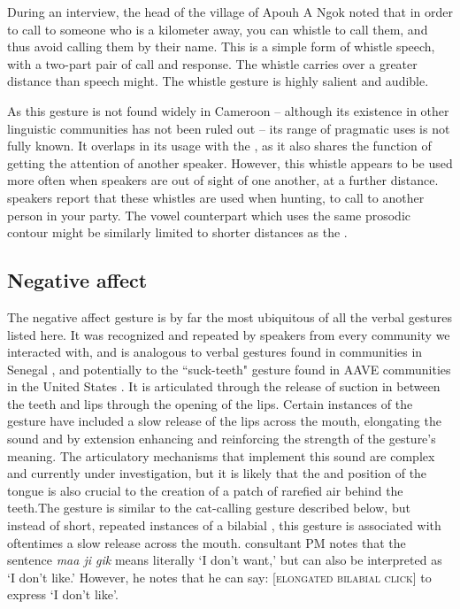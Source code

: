 \documentclass[output=paper
,newtxmath
,modfonts
,nonflat]{langsci/langscibook}
\begin{document}
During an interview, the head of the village of Apouh A Ngok noted that in order to call to someone who is a kilometer away, you can whistle to call them, and thus avoid calling them by their name. This is a simple form of whistle speech, with a two-part pair of call and response. The whistle carries over a greater distance than speech might. The whistle gesture is highly salient and audible. 

As this gesture is not found widely in Cameroon -- although its existence in other linguistic communities has not been ruled out -- its range of pragmatic uses is not fully known. It overlaps in its usage with the , as it also shares the function of getting the attention of another speaker.  However, this whistle appears to be used more often when speakers are out of sight of one another, at a further distance.  speakers report that these whistles are used when hunting, to call to another person in your party. The vowel counterpart which uses the same prosodic contour might be similarly limited to shorter distances as the . 

\subsection{Negative affect}\label{subsec:pillion:NegativeAffect}
The negative affect gesture is by far the most ubiquitous of all the verbal gestures listed here. It was recognized and repeated by speakers from every community we interacted with, and is analogous to verbal gestures found in  communities in Senegal \citep{grenobleetal2015}, and potentially to the ``suck-teeth" gesture found in AAVE communities in the United States \citep{rickfordrickford1976}. It is articulated through the release of suction in between the teeth and lips through the opening of the lips. Certain instances of the gesture have included a slow release of the lips across the mouth, elongating the sound and by extension enhancing and reinforcing the strength of the gesture's meaning. The articulatory mechanisms that implement this sound are complex and currently under investigation, but it is likely that the  and position of the tongue is also crucial to the creation of a patch of rarefied air behind the teeth.The gesture is similar to the cat-calling gesture described below, but instead of short, repeated instances of a bilabial , this gesture is associated with oftentimes a slow release across the mouth. %
 consultant PM notes that the sentence \textit{maa ji gik} means literally `I don't want,' but can also be interpreted as `I don't like.' However, he notes that he can say: [\textsc {elongated bilabial click}] to express `I don't like'. %
\end{document}

